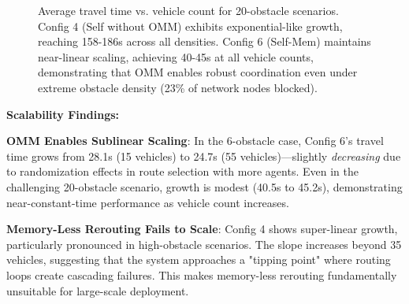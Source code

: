\documentclass[conference]{IEEEtran}
\begin{document}
\begin{figure}[t]
\centering
{}
\caption{Average travel time vs. vehicle count for 20-obstacle scenarios. Config 4 (Self without OMM) exhibits exponential-like growth, reaching 158-186s across all densities. Config 6 (Self-Mem) maintains near-linear scaling, achieving 40-45s at all vehicle counts, demonstrating that OMM enables robust coordination even under extreme obstacle density (23\% of network nodes blocked).}
\label{fig:scalability_20obs}
\end{figure}

\textbf{Scalability Findings:}

\textbf{OMM Enables Sublinear Scaling}: In the 6-obstacle case, Config 6's travel time grows from 28.1s (15 vehicles) to 24.7s (55 vehicles)—slightly \textit{decreasing} due to randomization effects in route selection with more agents. Even in the challenging 20-obstacle scenario, growth is modest (40.5s to 45.2s), demonstrating near-constant-time performance as vehicle count increases.

\textbf{Memory-Less Rerouting Fails to Scale}: Config 4 shows super-linear growth, particularly pronounced in high-obstacle scenarios. The slope increases beyond 35 vehicles, suggesting that the system approaches a "tipping point" where routing loops create cascading failures. This makes memory-less rerouting fundamentally unsuitable for large-scale deployment.
\end{document}
